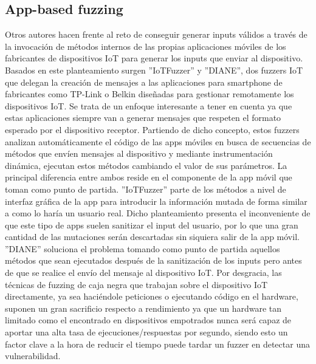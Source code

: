 \subsection{App-based fuzzing}
Otros autores hacen frente al reto de conseguir generar inputs 
válidos a través de la invocación de métodos internos de las propias aplicaciones móviles de los fabricantes de dispositivos IoT para generar los 
inputs que enviar al dispositivo.
Basados en este planteamiento surgen ''IoTFuzzer''\cite{Chen2018} y ''DIANE''\cite{Redini2021}, dos fuzzers IoT que delegan la creación de mensajes 
a las aplicaciones para smartphone de fabricantes como TP-Link o Belkin diseñadas para gestionar remotamente los dispositivos IoT. 
Se trata de un enfoque interesante a tener en cuenta ya que estas aplicaciones siempre van a generar mensajes que respeten el formato esperado
por el dispositivo receptor. Partiendo de dicho concepto, estos fuzzers analizan automáticamente el código de las apps móviles en busca de secuencias de 
métodos que envíen mensajes al dispositivo y mediante instrumentación dinámica, ejecutan estos métodos cambiando el valor de sus parámetros. La principal diferencia 
entre ambos reside en el componente de la app móvil que toman como punto de partida. ''IoTFuzzer'' parte de los métodos a nivel de interfaz gráfica de la app
para introducir la información mutada de forma similar a como lo haría un usuario real. Dicho planteamiento presenta el inconveniente de que este tipo 
de apps suelen sanitizar el input del usuario, por lo que una gran cantidad de las mutaciones serán descartadas sin siquiera salir de la app móvil.
''DIANE'' soluciona el problema tomando como punto de partida aquellos métodos que sean ejecutados después de la sanitización de los inputs pero antes de
que se realice el envío del mensaje al dispositivo IoT. Por desgracia, las técnicas de fuzzing de caja negra que trabajan sobre el dispositivo IoT
directamente, ya sea haciéndole peticiones o ejecutando código en el hardware, suponen un gran sacrificio respecto a rendimiento ya que un hardware 
tan limitado como el encontrado en dispositivos empotrados nunca será capaz de aportar una alta tasa de ejecuciones/respuestas por segundo, siendo esto un 
factor clave a la hora de reducir el tiempo puede tardar un fuzzer en detectar una vulnerabilidad.

